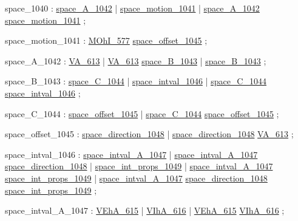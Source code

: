 \label{html:y1040}
space_1040              :  \hyperref[html:y1042]{space_A_1042}
                        |  \hyperref[html:y1041]{space_motion_1041}
                        |  \hyperref[html:y1042]{space_A_1042}  \hyperref[html:y1041]{space_motion_1041}
                        ;

\label{html:y1041}
space_motion_1041       :  \hyperref[html:y577]{MOhI_577}  \hyperref[html:y1045]{space_offset_1045}
                        ;

\label{html:y1042}
space_A_1042            :  \hyperref[html:y613]{VA_613}
                        |  \hyperref[html:y613]{VA_613}  \hyperref[html:y1043]{space_B_1043}
                        |  \hyperref[html:y1043]{space_B_1043}
                        ;

\label{html:y1043}
space_B_1043            :  \hyperref[html:y1044]{space_C_1044}
                        |  \hyperref[html:y1046]{space_intval_1046}
                        |  \hyperref[html:y1044]{space_C_1044}  \hyperref[html:y1046]{space_intval_1046}
                        ;

\label{html:y1044}
space_C_1044            :  \hyperref[html:y1045]{space_offset_1045}
                        |  \hyperref[html:y1044]{space_C_1044}  \hyperref[html:y1045]{space_offset_1045}
                        ;

\label{html:y1045}
space_offset_1045       :  \hyperref[html:y1048]{space_direction_1048}
                        |  \hyperref[html:y1048]{space_direction_1048}  \hyperref[html:y613]{VA_613}
                        ;

\label{html:y1046}
space_intval_1046       :  \hyperref[html:y1047]{space_intval_A_1047}
                        |  \hyperref[html:y1047]{space_intval_A_1047}  \hyperref[html:y1048]{space_direction_1048}
                        |  \hyperref[html:y1049]{space_int_props_1049}
                        |  \hyperref[html:y1047]{space_intval_A_1047}  \hyperref[html:y1049]{space_int_props_1049}
                        |  \hyperref[html:y1047]{space_intval_A_1047}  \hyperref[html:y1048]{space_direction_1048}
                                  \hyperref[html:y1049]{space_int_props_1049}
                        ;

\label{html:y1047}
space_intval_A_1047     :  \hyperref[html:y615]{VEhA_615}
                        |  \hyperref[html:y616]{VIhA_616}
                        |  \hyperref[html:y615]{VEhA_615}  \hyperref[html:y616]{VIhA_616}
                        ;

